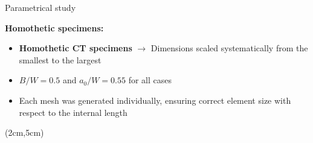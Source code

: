 \documentclass[9pt]{beamer}
\begin{document}
\begin{frame}{Parametrical study}

\textcolor{MINESBlue}{\textbf{Homothetic specimens:}}
\vspace{0.15cm}
    \begin{itemize}
        \item \textbf{Homothetic CT specimens} $\rightarrow$ Dimensions scaled systematically from the smallest to the largest
        \vspace{0.15cm}
        \item $B/W = 0.5$ and $a_0/W = 0.55$ for all cases
        \vspace{0.15cm}
        \item Each mesh was generated individually, ensuring correct element size with respect to the internal length
    \end{itemize}

    \vspace{4cm}
    
    \begin{textblock*}{11cm}(2cm,5cm)
    \end{textblock*}


\end{frame}

\end{document}
